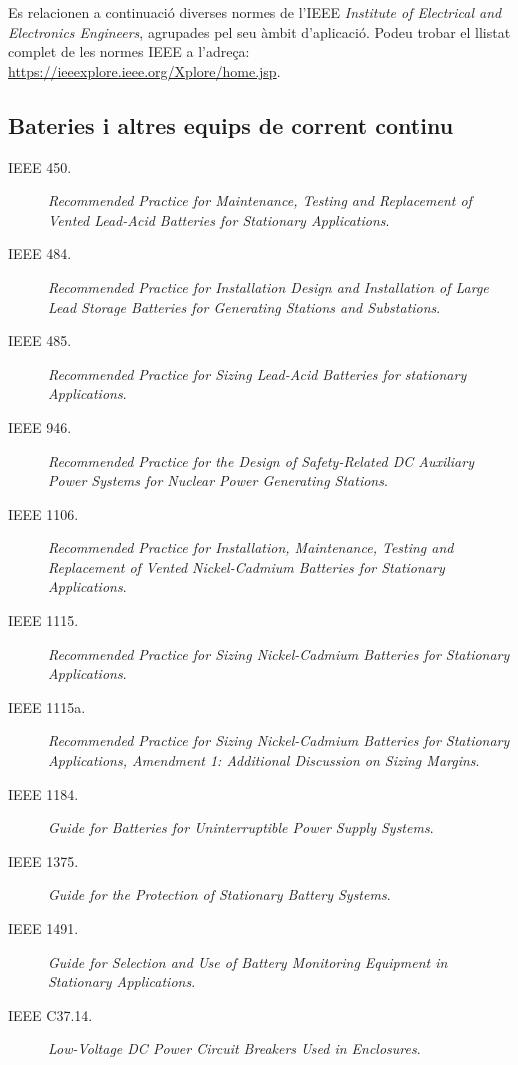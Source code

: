 Es relacionen a continuació diverses normes de l'IEEE \textit{Institute of Electrical and Electronics Engineers}, agrupades pel seu àmbit d'aplicació. Podeu trobar el llistat complet de les normes IEEE a l'adreça: \href{https://ieeexplore.ieee.org/Xplore/home.jsp}{https:/\!\!/ieeexplore.ieee.org/Xplore/home.jsp}.

\subsection*{Bateries i altres equips de corrent continu}
\begin{description}
    \item [\hspace{5mm}IEEE 450.] \textit{Recommended Practice for  Maintenance, Testing and Replacement of Vented Lead-Acid Batteries for Stationary Applications}.
    \item [\hspace{5mm}IEEE 484.] \textit{Recommended Practice for Installation Design and Installation of Large Lead Storage Batteries for Generating Stations and Substations}.
    \item [\hspace{5mm}IEEE 485.] \textit{Recommended Practice for Sizing Lead-Acid Batteries for stationary Applications}.
    \item [\hspace{5mm}IEEE 946.] \textit{Recommended Practice for the Design of Safety-Related DC Auxiliary Power Systems for Nuclear Power Generating Stations}.
    \item [\hspace{5mm}IEEE 1106.] \textit{Recommended Practice for Installation, Maintenance, Testing and Replacement of Vented Nickel-Cadmium Batteries for Stationary Applications}.
    \item [\hspace{5mm}IEEE 1115.] \textit{Recommended Practice for Sizing Nickel-Cadmium Batteries for Stationary Applications}.
    \item [\hspace{5mm}IEEE 1115a.] \textit{Recommended Practice for Sizing Nickel-Cadmium Batteries for Stationary Applications, Amendment 1: Additional Discussion on Sizing Margins}.
    \item [\hspace{5mm}IEEE 1184.] \textit{Guide for Batteries for Uninterruptible Power Supply Systems}.
    \item [\hspace{5mm}IEEE 1375.] \textit{Guide for the Protection of Stationary Battery Systems}.
    \item [\hspace{5mm}IEEE 1491.] \textit{Guide for Selection and Use of Battery Monitoring Equipment in Stationary Applications}.
    \item [\hspace{5mm}IEEE C37.14.] \textit{Low-Voltage DC Power Circuit Breakers Used in Enclosures}.
\end{description}


